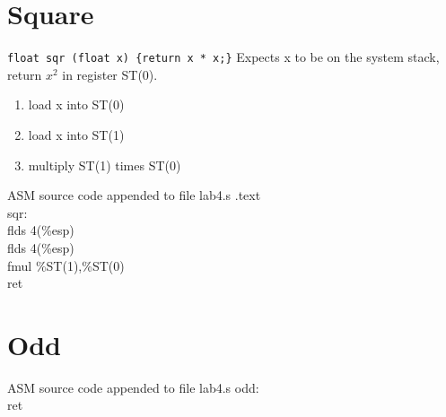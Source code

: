 \documentclass{article}
\begin{document}
\clearpage\section*{Square}
\verb|float sqr (float x) {return x * x;}|
Expects x to be on the system stack, return $x^2$ in register ST(0).
\begin{enumerate}
\item load x into ST(0)
\item load x into ST(1)
\item multiply ST(1) times ST(0)

\end{enumerate}
\begin{GFT}{ASM source code appended to file lab4.s}
\+.text\\
\+sqr:\\
\+  flds 4(\%esp)\\
\+  flds 4(\%esp)\\
\+  fmul \%ST(1),\%ST(0)\\
\+  ret\\
\end{GFT}

\clearpage\section*{Odd}
\begin{GFT}{ASM source code appended to file lab4.s}
\+odd:\\
\+  ret\\
\end{GFT}
\end{document}
